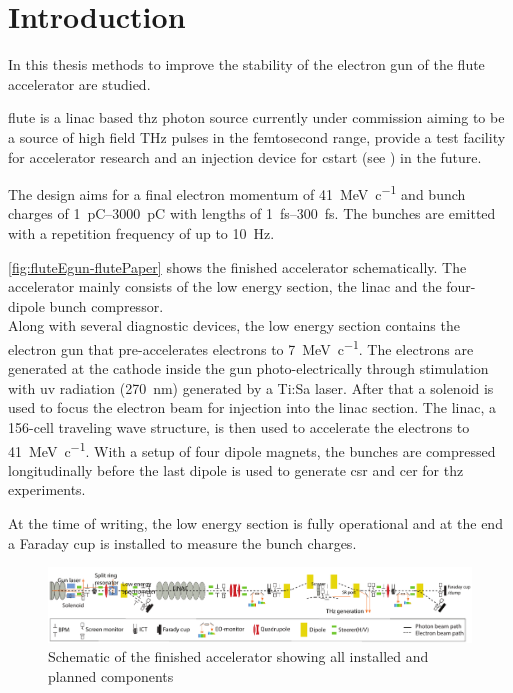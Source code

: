 \chapter{Introduction}
In this thesis methods to improve the stability of the electron gun of the \gls{flute} accelerator are studied.

\Gls{flute} is a \gls{linac} based \gls{thz} photon source currently under commission aiming to be a source of high field THz pulses in the femtosecond range, provide a test facility for accelerator research and an injection device for \gls{cstart} (see \cite{SchaeferHaererPapash2019_1000091183}) in the future. \cite{Naknaimueang:2011zz}

The design aims for a final electron momentum of \SI{41}{\MeV\per c} and bunch charges of \SIrange{1}{3000}{\pico\coulomb} with lengths of \SIrange{1}{300}{\fs}. The bunches are emitted with a repetition frequency of up to \SI{10}{\hertz}. \cite{Malygin2018}

\autoref{fig:fluteEgun-flutePaper} shows the finished accelerator schematically. The accelerator mainly consists of the low energy section, the \gls{linac} and the four-dipole bunch compressor.\\
Along with several diagnostic devices, the low energy section contains the electron gun that pre-accelerates electrons to \SI{7}{\MeV\per c}. The electrons are generated at the cathode inside the gun photo-electrically through stimulation with \gls{uv} radiation (\SI{270}{\nm}) generated by a Ti:Sa laser. After that a solenoid is used to focus the electron beam for injection into the \gls{linac} section. The \gls{linac}, a 156-cell traveling wave structure, is then used to accelerate the electrons to \SI{41}{\MeV\per c}. With a setup of four dipole magnets, the bunches are compressed longitudinally before the last dipole is used to generate \gls{csr} and \gls{cer} for \gls{thz} experiments. \cite{Nasse:IPAC13-WEPWA010}

At the time of writing, the low energy section is fully operational and at the end a Faraday cup is installed to measure the bunch charges.

\begin{figure}[tb]
	\centering
	\includegraphics[width=\textwidth]{chap/StabilityOfTheElectronGun/img/flutePaper.png}
	\caption{Schematic of the finished accelerator showing all installed and planned components \cite{Yan2018}}
	\label{fig:fluteEgun-flutePaper}
\end{figure}

